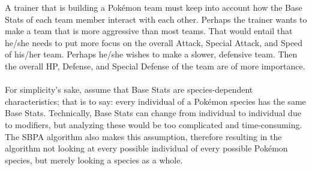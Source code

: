 \documentclass{article}
\begin{document}
A trainer that is building a Pok\'emon team must keep into account how the Base Stats of each team member interact with each other. Perhaps the trainer wants to make a team that is more aggressive than most teams. That would entail that he/she needs to put more focus on the overall Attack, Special Attack, and Speed of his/her team. Perhaps he/she wishes to make a slower, defensive team. Then the overall HP, Defense, and Special Defense of the team are of more importance.\\\\
For simplicity's sake, assume that Base Stats are species-dependent characteristics; that is to say: every individual of a Pok\'emon species has the same Base Stats. Technically, Base Stats can change from individual to individual due to modifiers, but analyzing these would be too complicated and time-consuming. The SBPA algorithm also makes this assumption, therefore resulting in the algorithm not looking at every possible individual of every possible Pok\'emon species, but merely looking a species as a whole.
\end{document}
